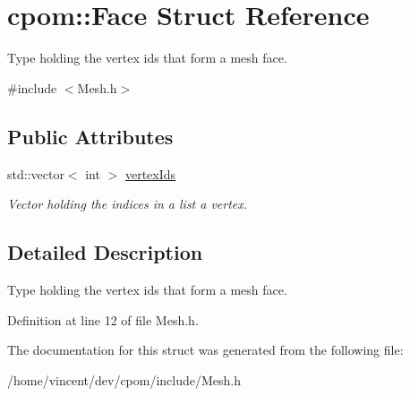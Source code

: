 \hypertarget{structcpom_1_1_face}{}\section{cpom\+:\+:Face Struct Reference}
\label{structcpom_1_1_face}


Type holding the vertex ids that form a mesh face.  




{\ttfamily \#include $<$Mesh.\+h$>$}

\subsection*{Public Attributes}
\begin{DoxyCompactItemize}
\item 
std\+::vector$<$ int $>$ \hyperlink{structcpom_1_1_face_a9bd1ca1550c1542e8eb14f113b965f12}{vertex\+Ids}\hypertarget{structcpom_1_1_face_a9bd1ca1550c1542e8eb14f113b965f12}{}\label{structcpom_1_1_face_a9bd1ca1550c1542e8eb14f113b965f12}

\begin{DoxyCompactList}\small\item\em Vector holding the indices in a list a vertex. \end{DoxyCompactList}\end{DoxyCompactItemize}


\subsection{Detailed Description}
Type holding the vertex ids that form a mesh face. 

Definition at line 12 of file Mesh.\+h.



The documentation for this struct was generated from the following file\+:\begin{DoxyCompactItemize}
\item 
/home/vincent/dev/cpom/include/Mesh.\+h\end{DoxyCompactItemize}
